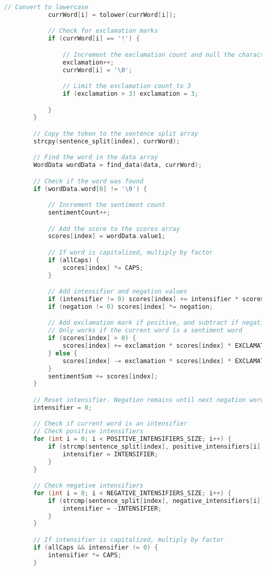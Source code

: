 \documentclass[12pt]{article}
\begin{document}
\begin{lstlisting}[basicstyle=\tiny, language=c]
			// Convert to lowercase
			currWord[i] = tolower(currWord[i]);

			// Check for exclamation marks
			if (currWord[i] == '!') {

				// Increment the exclamation count and null the character
				exclamation++;
				currWord[i] = '\0';

				// Limit the exclamation count to 3
				if (exclamation > 3) exclamation = 3;

			}
		}

		// Copy the token to the sentence split array
		strcpy(sentence_split[index], currWord);

		// Find the word in the data array
		WordData wordData = find_data(data, currWord);

		// Check if the word was found
		if (wordData.word[0] != '\0') {

			// Increment the sentiment count
			sentimentCount++;

			// Add the score to the scores array
			scores[index] = wordData.value1;

			// If word is capitalized, multiply by factor
			if (allCaps) {
				scores[index] *= CAPS;
			}

			// Add intensifier and negation values
			if (intensifier != 0) scores[index] += intensifier * scores[index];
			if (negation != 0) scores[index] *= negation;

			// Add exclamation mark if positive, and subtract if negative
			// Only works if the current word is a sentiment word
			if (scores[index] > 0) {
				scores[index] += exclamation * scores[index] * EXCLAMATION;
			} else {
				scores[index] -= exclamation * scores[index] * EXCLAMATION;
			}
			sentimentSum += scores[index];
		}

		// Reset intensifier. Negation remains until next negation word
		intensifier = 0;

		// Check if current word is an intensifier
		// Check positive intensifiers
		for (int i = 0; i < POSITIVE_INTENSIFIERS_SIZE; i++) {
			if (strcmp(sentence_split[index], positive_intensifiers[i]) == 0) {
				intensifier = INTENSIFIER;
			}
		}

		// Check negative intensifiers
		for (int i = 0; i < NEGATIVE_INTENSIFIERS_SIZE; i++) {
			if (strcmp(sentence_split[index], negative_intensifiers[i]) == 0) {
				intensifier = -INTENSIFIER;
			}
		}

		// If intensifier is capitalized, multiply by factor
		if (allCaps && intensifier != 0) {
			intensifier *= CAPS;
		}


\end{lstlisting}
\end{document}
